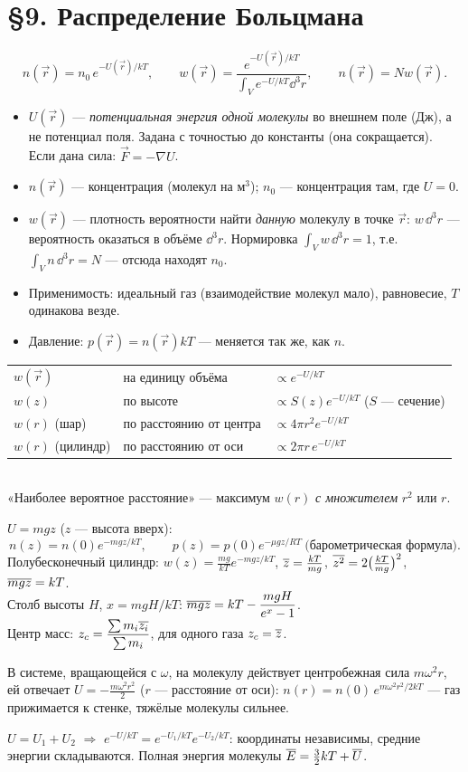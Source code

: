 \section*{§9. Распределение Больцмана}

\begin{basics}
\[n(\vec r)=n_0\,e^{-U(\vec r)/kT},\qquad
w(\vec r)=\frac{e^{-U(\vec r)/kT}}{\int_Ve^{-U/kT}\dd^3r},\qquad n(\vec r)=Nw(\vec r).\]
\begin{itemize}
\item $U(\vec r)$ — \emph{потенциальная энергия одной молекулы} во внешнем поле (Дж), а не потенциал поля.
Задана с точностью до константы (она сокращается). Если дана сила: $\vec F=-\nabla U$.
\item $n(\vec r)$ — концентрация (молекул на м$^3$); $n_0$ — концентрация там, где $U=0$.
\item $w(\vec r)$ — плотность вероятности найти \emph{данную} молекулу в точке $\vec r$: $w\,\dd^3r$ — вероятность
оказаться в объёме $\dd^3r$. Нормировка $\int_Vw\,\dd^3r=1$, т.е.\ $\int_Vn\,\dd^3r=N$ — отсюда находят $n_0$.
\item Применимость: идеальный газ (взаимодействие молекул мало), равновесие, $T$ одинакова везде.
\item Давление: $p(\vec r)=n(\vec r)kT$ — меняется так же, как $n$.
\end{itemize}

\begin{tabular}{@{}lll@{}}
$w(\vec r)$ & на единицу объёма & $\propto e^{-U/kT}$\\
$w(z)$ & по высоте & $\propto S(z)e^{-U/kT}$ ($S$ — сечение)\\
$w(r)$ (шар) & по расстоянию от центра & $\propto4\pi r^2e^{-U/kT}$\\
$w(r)$ (цилиндр) & по расстоянию от оси & $\propto2\pi r\,e^{-U/kT}$
\end{tabular}
\\«Наиболее вероятное расстояние» — максимум $w(r)$ \emph{с множителем} $r^2$ или $r$.

$U=mgz$ ($z$ — высота вверх):
\[n(z)=n(0)e^{-mgz/kT},\qquad p(z)=p(0)e^{-\mu gz/RT}\ \text{(барометрическая формула)}.\]
Полубесконечный цилиндр: $w(z)=\frac{mg}{kT}e^{-mgz/kT}$, $\overline{z}=\frac{kT}{mg}$, $\overline{z^2}=2\big(\frac{kT}{mg}\big)^2$, $\overline{mgz}=kT$.
\\Столб высоты $H$, $x=mgH/kT$: $\overline{mgz}=kT-\dfrac{mgH}{e^{x}-1}$.
\\Центр масс: $z_c=\dfrac{\sum m_i\overline{z_i}}{\sum m_i}$, для одного газа $z_c=\overline{z}$.

В системе, вращающейся с $\omega$, на молекулу действует центробежная сила $m\omega^2r$, ей отвечает
$U=-\frac{m\omega^2r^2}{2}$ ($r$ — расстояние от оси):
$n(r)=n(0)\,e^{m\omega^2r^2/2kT}$ — газ прижимается к стенке, тяжёлые молекулы сильнее.

$U=U_1+U_2$ $\Rightarrow$ $e^{-U/kT}=e^{-U_1/kT}e^{-U_2/kT}$: координаты независимы, средние энергии складываются.
Полная энергия молекулы $\overline{E}=\frac32kT+\overline{U}$.
\end{basics}

